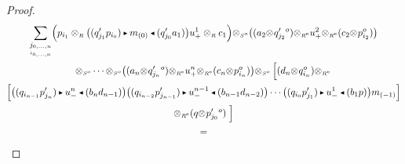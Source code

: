 \documentclass[reqno, a4paper, 10pt]{amsart}
\numberwithin{equation}{section}
\theoremstyle{plain}
\theoremstyle{definition}
\theoremstyle{remark}
\begin{document}
\begin{proof}
\begin{multline*}
 \underset{\underset{i_{0,\ldots, n}}{j_{0,\ldots, n}}}{\sum} \Big(p_{i_1} \otimes_{{\scriptscriptstyle{R}}} \big((q'_{j_1}p_{i_0}) {{\,\raise1pt\hbox{$\scriptscriptstyle{\blacktriangleright}$} \, }} m_{(0)} {{\,\raise1pt\hbox{$\scriptscriptstyle{\blacktriangleleft}$} \, }} (q'_{j_0}a_1)\big) u_{+}^1 \otimes_{{\scriptscriptstyle{R}}} c_1\Big){\otimes_{\scriptscriptstyle{{S^{{{o}}}}}}}{\big( {(a_2{\otimes_{\scriptscriptstyle{{}}}}q_{j_2}'{}^o){\otimes_{\scriptscriptstyle{{\scriptscriptstyle{{R^{\rm e}}}}}}}u^2_{+}{\otimes_{\scriptscriptstyle{{\scriptscriptstyle{{R^{\rm e}}}}}}}(c_2{\otimes_{\scriptscriptstyle{{}}}}p_{i_2}^o)} \big)} \\ {\otimes_{\scriptscriptstyle{{S^{{{o}}}}}}} \cdots {\otimes_{\scriptscriptstyle{{S^{{{o}}}}}}}{\big( {(a_{n}{\otimes_{\scriptscriptstyle{{}}}}q_{j_{n}}'{}^o){\otimes_{\scriptscriptstyle{{\scriptscriptstyle{{R^{\rm e}}}}}}}u^{n}_{+}{\otimes_{\scriptscriptstyle{{\scriptscriptstyle{{R^{\rm e}}}}}}}(c_{n}{\otimes_{\scriptscriptstyle{{}}}}p_{i_n}^o)} \big)}  {\otimes_{\scriptscriptstyle{{S^{{{o}}}}}}} \left[\underset{}{} (d_{n}{\otimes_{\scriptscriptstyle{{}}}}q_{i_n}^o){\otimes_{\scriptscriptstyle{{\scriptscriptstyle{{R^{\rm e}}}}}}} \right. \\ \Big[ {\big( {(q_{i_{n-1}}p'_{j_n}){{\,\raise1pt\hbox{$\scriptscriptstyle{\blacktriangleright}$} \, }} u^{n}_{-} {{\,\raise1pt\hbox{$\scriptscriptstyle{\blacktriangleleft}$} \, }} (b_nd_{n-1})} \big)} {\big( {(q_{i_{n-2}}p'_{j_{n-1}}){{\,\raise1pt\hbox{$\scriptscriptstyle{\blacktriangleright}$} \, }} u^{n-1}_{-} {{\,\raise1pt\hbox{$\scriptscriptstyle{\blacktriangleleft}$} \, }} (b_{n-1}d_{n-2})} \big)} \cdots {\big( {(q_{i_{0}}p'_{j_{1}}){{\,\raise1pt\hbox{$\scriptscriptstyle{\blacktriangleright}$} \, }} u^{1}_{-} {{\,\raise1pt\hbox{$\scriptscriptstyle{\blacktriangleleft}$} \, }} (b_{1}p)} \big)}m_{(-1)} \Big] \\ {\otimes_{\scriptscriptstyle{{\scriptscriptstyle{{R^{\rm e}}}}}}}   
(q{\otimes_{\scriptscriptstyle{{}}}}p'_{j_0}{}^o) \left. \underset{}{} \right] \\ \,=\,

\end{multline*}
\end{proof}
\end{document}
